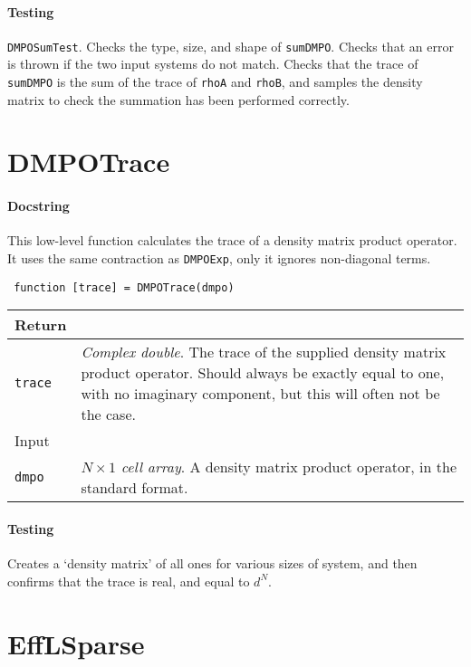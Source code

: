  \paragraph{Testing} \lstinline$DMPOSumTest$. Checks the type, size, and shape of \lstinline$sumDMPO$. Checks that an error is thrown if the two input systems do not match. Checks that the trace of \lstinline$sumDMPO$ is the sum of the trace of \lstinline$rhoA$ and \lstinline$rhoB$, and samples the density matrix to check the summation has been performed correctly.

 \section{DMPOTrace}
 \paragraph{Docstring} This low-level function calculates the trace of a density matrix product operator. It uses the same contraction as \lstinline$DMPOExp$, only it ignores non-diagonal terms.
 \begin{lstlisting}
 function [trace] = DMPOTrace(dmpo) \end{lstlisting}
 \begin{longtabu}{X[1,l]X[4,l]}
 \hline
 Return & \\ \hline
 \lstinline$trace$ & \emph{Complex double}. The trace of the supplied density matrix product operator. Should always be exactly equal to one, with no imaginary component, but this will often not be the case. \\ \hline
 Input & \\ \hline
 \lstinline$dmpo$ & \emph{\(N \times 1\) cell array}. A density matrix product operator, in the standard format. \\
 \hline
 \end{longtabu}
 \paragraph{Testing} Creates a `density matrix' of all ones for various sizes of system, and then confirms that the trace is real, and equal to \(d^{N}\).

 \section{EffLSparse}
